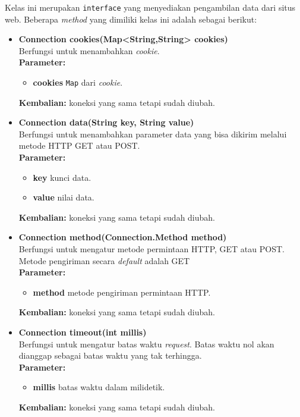 Kelas ini merupakan \texttt{interface} yang menyediakan pengambilan data dari situs web. Beberapa \textit{method} yang dimiliki kelas ini adalah sebagai berikut:

\begin{itemize}
	\item \textbf{Connection cookies(Map<String,String> cookies)} \\
		Berfungsi untuk menambahkan \textit{cookie}. \\
		\textbf{Parameter:}
		\begin{itemize}
			\item \textbf{cookies} \texttt{Map} dari \textit{cookie}.
		\end{itemize}
		\textbf{Kembalian:} koneksi yang sama tetapi sudah diubah.
		
		\item \textbf{Connection data(String key, String value)} \\
		Berfungsi untuk menambahkan parameter data yang bisa dikirim melalui metode HTTP GET atau POST. \\
		\textbf{Parameter:}
		\begin{itemize}
			\item \textbf{key} kunci data.
			\item \textbf{value} nilai data.
		\end{itemize}
		\textbf{Kembalian:} koneksi yang sama tetapi sudah diubah.
		
		\item \textbf{Connection method(Connection.Method method)} \\
		Berfungsi untuk mengatur metode permintaan HTTP, GET atau POST. Metode pengiriman secara \textit{default} adalah GET\\
		\textbf{Parameter:}
		\begin{itemize}
			\item \textbf{method} metode pengiriman permintaan HTTP.
		\end{itemize}
		\textbf{Kembalian:} koneksi yang sama tetapi sudah diubah.
		
		\item \textbf{Connection timeout(int millis)} \\
		Berfungsi untuk mengatur batas waktu \textit{request}. Batas waktu nol akan dianggap sebagai batas waktu yang tak terhingga. \\
		\textbf{Parameter:}
		\begin{itemize}
			\item \textbf{millis} batas waktu dalam milidetik.
		\end{itemize}
		\textbf{Kembalian:} koneksi yang sama tetapi sudah diubah.
		

\end{itemize}
